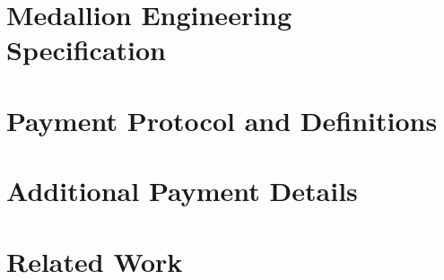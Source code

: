 \documentclass{article}
\begin{document}
    \section{Medallion Engineering Specification}
    \label{medallionspow}
    

    \section{Payment Protocol and Definitions}
    \label{paymentsprotocol}
    
    
    \section{Additional Payment Details}
    \label{paymentsextra}
    
    
    \section{Related Work}
    \label{sec:related}
    
\end{document}
